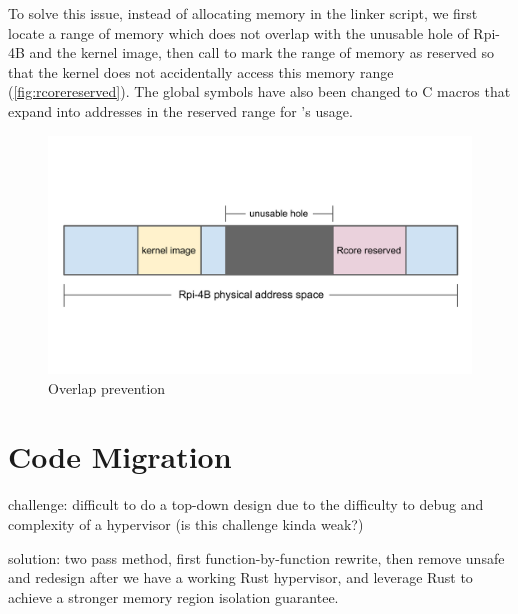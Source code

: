 To solve this issue, instead of allocating memory in the linker script,
we first locate a range of memory which does not overlap with the unusable hole
of Rpi-4B and the kernel image, then call  to
mark the range of memory as reserved so that the kernel does not accidentally
access this memory range (\autoref{fig:rcorereserved}).
The global symbols have also been changed to C macros that expand into
addresses in the reserved range for \rustsec{}'s \rustcore{} usage.

\begin{figure}[H]
    \includegraphics[scale=0.60]{figures/rcore_reserved.pdf}
    \caption{Overlap prevention}
    \label{fig:rcorereserved}
\end{figure}

\section{Code Migration}

challenge: difficult to do a top-down design due to the difficulty to debug
and complexity of a hypervisor (is this challenge kinda weak?)

solution: two pass method, first function-by-function rewrite, then remove
unsafe and redesign after we have a working Rust hypervisor, and leverage
Rust to achieve a stronger memory region isolation guarantee.

